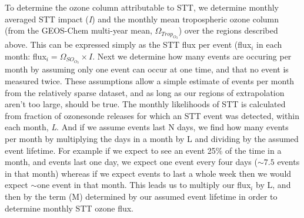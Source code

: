 \documentclass[acp, manuscript]{copernicus} %
\begin{document}
    To determine the ozone column attributable to STT, we determine monthly averaged STT impact (\textit{I}) and the monthly mean tropospheric ozone column (from the GEOS-Chem multi-year mean, $\Omega_{Trop_{O_3}}$) over the regions described above.
    This can be expressed simply as the STT flux per event (flux$_i$ in each month: flux$_i = \Omega_{SO_{O_3}} \times I$.
    Next we determine how many events are occuring per month by assuming only one event can occur at one time, and that no event is measured twice.
    These assumptions allow a simple estimate of events per month from the relatively sparse dataset, and as long as our regions of extrapolation aren't too large, should be true.
    The monthly likelihoods of STT is calculated from fraction of ozonesonde releases for which an STT event was detected, within each month, \textit{L}.
    And if we assume events last N days, we find how many events per month by multiplying the days in a month by L and dividing by the assumed event lifetime.
    For example if we expect to see an event 25\% of the time in a month, and events last one day, we expect one event every four days ($\sim 7.5$ events in that month) whereas if we expect events to last a whole week then we would expect $\sim$one event in that month.
    This leads us to multiply our flux$_i$ by L, and then by the term (M) determined by our assumed event lifetime in order to determine monthly STT ozone flux.
    
\end{document}
